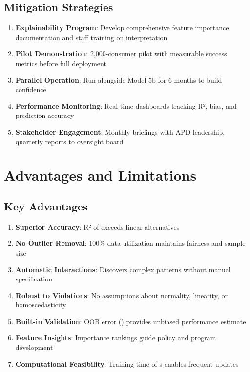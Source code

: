 \subsection{Mitigation Strategies}

\begin{enumerate}
    \item \textbf{Explainability Program}: Develop comprehensive feature importance documentation and staff training on interpretation
    \item \textbf{Pilot Demonstration}: 2,000-consumer pilot with measurable success metrics before full deployment
    \item \textbf{Parallel Operation}: Run alongside Model 5b for 6 months to build confidence
    \item \textbf{Performance Monitoring}: Real-time dashboards tracking R², bias, and prediction accuracy
    \item \textbf{Stakeholder Engagement}: Monthly briefings with APD leadership, quarterly reports to oversight board
\end{enumerate}

\section{Advantages and Limitations}

\subsection{Key Advantages}

\begin{enumerate}
    \item \textbf{Superior Accuracy}: R² of \ModelNineRSquaredTest{} exceeds linear alternatives
    \item \textbf{No Outlier Removal}: 100\% data utilization maintains fairness and sample size
    \item \textbf{Automatic Interactions}: Discovers complex patterns without manual specification
    \item \textbf{Robust to Violations}: No assumptions about normality, linearity, or homoscedasticity
    \item \textbf{Built-in Validation}: OOB error (\ModelNineOOBError{}) provides unbiased performance estimate
    \item \textbf{Feature Insights}: Importance rankings guide policy and program development
    \item \textbf{Computational Feasibility}: Training time of \ModelNineTrainingTime{}s enables frequent updates
\end{enumerate}

